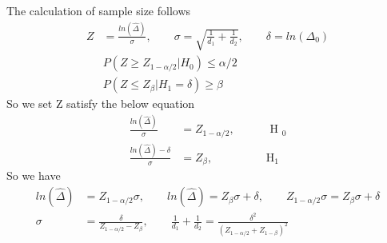 \documentclass[11pt]{article} %
\begin{document}
The calculation of sample size follows
\begin{align*}
	Z &= \frac{ln(\hat{\Delta})}{\sigma}, \qquad \sigma = \sqrt{\frac{1}{d_1} + \frac{1}{d_2}}, \qquad \delta = ln(\Delta_0) \\
 &	P(Z \geq Z_{1-\alpha/2}| H_0)  \leq \alpha/2 \\
 &	P(Z \leq Z_{\beta}| H_1= \delta)  \geq \beta
\end{align*}
So we set Z satisfy the below equation
\begin{align*}
	\frac{ln(\hat{\Delta})}{\sigma} &= Z_{1-\alpha/2}, \qquad &\text{ H }_0\\
	\frac{ln(\hat{\Delta}) - \delta}{\sigma} &= Z_{\beta},  \qquad &\text{H}_1
\end{align*}
So we have
\begin{align*}
	ln(\hat{\Delta}) &= Z_{1-\alpha/2} \sigma, \qquad	ln(\hat{\Delta}) = Z_{\beta} {\sigma} + \delta ,\qquad	Z_{1-\alpha/2} \sigma = Z_{\beta} {\sigma} + \delta \\
	\sigma &= \frac{\delta}{Z_{1-\alpha/2} - Z_{\beta}}, \qquad 	\frac{1}{d_1} + \frac{1}{d_2} = \frac{\delta^2}{(Z_{1-\alpha/2} + Z_{1-\beta})^2}
\end{align*}
\end{document}
